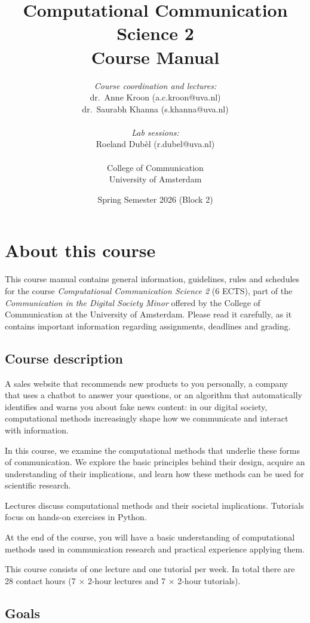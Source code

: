 \documentclass[a4paper,10pt]{report}
\title{Computational Communication Science 2\\Course Manual}
\author{\emph{Course coordination and lectures:}\\
dr.\ Anne Kroon (a.c.kroon@uva.nl)\\
dr.\ Saurabh Khanna (s.khanna@uva.nl)\\
\\
\emph{Lab sessions:}\\
Roeland Dubèl (r.dubel@uva.nl)\\
\\
College of Communication\\
University of Amsterdam}
\date{Spring Semester 2026 (Block 2)}
\begin{document}
\maketitle
\tableofcontents

\chapter{About this course}

This course manual contains general information, guidelines, rules and schedules for the course \emph{Computational Communication Science 2} (6 ECTS), part of the \emph{Communication in the Digital Society Minor} offered by the College of Communication at the University of Amsterdam. Please read it carefully, as it contains important information regarding assignments, deadlines and grading.

\section{Course description}

A sales website that recommends new products to you personally, a company that uses a chatbot to answer your questions, or an algorithm that automatically identifies and warns you about fake news content: in our digital society, computational methods increasingly shape how we communicate and interact with information.

In this course, we examine the computational methods that underlie these forms of communication. We explore the basic principles behind their design, acquire an understanding of their implications, and learn how these methods can be used for scientific research.

Lectures discuss computational methods and their societal implications. Tutorials focus on hands-on exercises in Python.

At the end of the course, you will have a basic understanding of computational methods used in communication research and practical experience applying them.

This course consists of one lecture and one tutorial per week. In total there are 28 contact hours (7 × 2-hour lectures and 7 × 2-hour tutorials).

\section{Goals}
\end{document}
